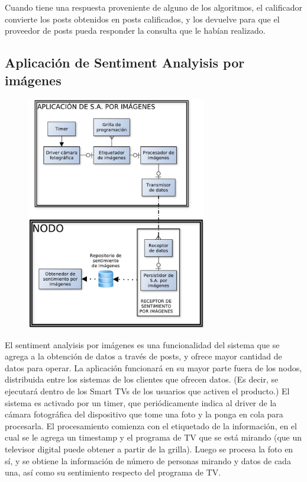 Cuando tiene una respuesta proveniente de alguno de los algoritmos, el calificador convierte los posts obtenidos en posts calificados, y los devuelve para que el proveedor de posts pueda responder la consulta que le habían realizado.


\subsection{Aplicación de Sentiment Analyisis por imágenes}

\begin{figure}[H]
\centering
\includegraphics[width=0.7\textwidth]{graph/smarttv.pdf}
\end{figure}

El sentiment analyisis por imágenes es una funcionalidad del sistema que se agrega a la obtención de datos a través de posts, y ofrece mayor cantidad de datos para operar. La aplicación funcionará en su mayor parte fuera de los nodos, distribuida entre los sistemas de los clientes que ofrecen datos. (Es decir, se ejecutará dentro de los Smart TVs de los usuarios que activen el producto.) El sistema es activado por un timer, que periódicamente indica al driver de la cámara fotográfica del dispositivo que tome una foto y la ponga en cola para procesarla. El procesamiento comienza con el etiquetado de la información, en el cual se le agrega un timestamp y el programa de TV que se está mirando (que un televisor digital puede obtener a partir de la grilla). Luego se procesa la foto en sí, y se obtiene la información de número de personas mirando y datos de cada una, así como su sentimiento respecto del programa de TV.

